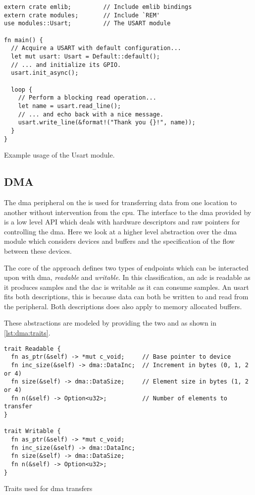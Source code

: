 \begin{listing}[H]
  \begin{verbatim}
extern crate emlib;         // Include emlib bindings
extern crate modules;       // Include `REM'
use modules::Usart;         // The USART module

fn main() {
  // Acquire a USART with default configuration...
  let mut usart: Usart = Default::default();
  // ... and initialize its GPIO.
  usart.init_async();

  loop {
    // Perform a blocking read operation...
    let name = usart.read_line();
    // ... and echo back with a nice message.
    usart.write_line(&format!("Thank you {}!", name));
  }
}
  \end{verbatim}
  \caption{Example usage of the Usart module.}
  \label{lst:usart_abstraction}
\end{listing}


\subsection{DMA}

The \gls{dma} peripheral on the {\gecko} is used for transferring data from one location to another without intervention from the \gls{cpu}.
The interface to the \gls{dma} provided by {\emlib} is a low level API which deals with hardware descriptors and raw pointers for controlling the \gls{dma}.
Here we look at a higher level abstraction over the \gls{dma} module which considers devices and buffers and the specification of the flow between these devices.

The core of the approach defines two types of endpoints which can be interacted upon with \gls{dma}, \emph{readable} and \emph{writable}.
In this classification, an \gls{adc} is readable as it produces samples and the \gls{dac} is writable as it can consume samples.
An \gls{usart} fits both descriptions, this is because data can both be written to and read from the peripheral.
Both descriptions does also apply to memory allocated buffers.

These abstractions are modeled by providing the two   and  as shown in \autoref{lst:dma:traits}.

\begin{listing}[H]
  \begin{verbatim}
trait Readable {
  fn as_ptr(&self) -> *mut c_void;     // Base pointer to device
  fn inc_size(&self) -> dma::DataInc;  // Increment in bytes (0, 1, 2 or 4)
  fn size(&self) -> dma::DataSize;     // Element size in bytes (1, 2 or 4)
  fn n(&self) -> Option<u32>;          // Number of elements to transfer
}

trait Writable {
  fn as_ptr(&self) -> *mut c_void;
  fn inc_size(&self) -> dma::DataInc;
  fn size(&self) -> dma::DataSize;
  fn n(&self) -> Option<u32>;
}
  \end{verbatim}
  \caption{Traits used for \gls{dma} transfers}
  \label{lst:dma:traits}
\end{listing}

